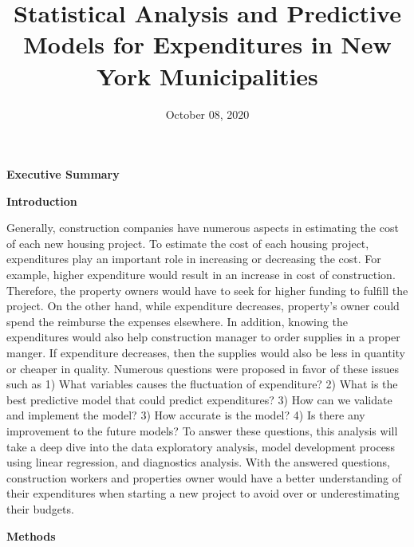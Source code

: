 \documentclass[11pt]{article}\usepackage[]{graphicx}\usepackage[]{color}
\title{Statistical Analysis and Predictive Models for Expenditures in New York Municipalities\vspace{-5ex}}
\date{October 08, 2020\vspace{-5ex}}
\begin{document}
 
\maketitle








\noindent\textbf{Executive Summary} 
\hfill \break

\noindent\textbf{Introduction} 

\noindent Generally, construction companies have numerous aspects in estimating the cost of each new housing project. To estimate the cost of each housing project, expenditures play an important role in increasing or decreasing the cost. For example, higher expenditure would result in an increase in cost of construction. Therefore, the property owners would have to seek for higher funding to fulfill the project. On the other hand, while expenditure decreases, property’s owner could spend the reimburse the expenses elsewhere. In addition, knowing the expenditures would also help construction manager to order supplies in a proper manger. If expenditure decreases, then the supplies would also be less in quantity or cheaper in quality. Numerous questions were proposed in favor of these issues such as 1) What variables causes the fluctuation of expenditure? 2) What is the best predictive model that could predict expenditures? 3) How can we validate and implement the model? 3) How accurate is the model? 4) Is there any improvement to the future models? To answer these questions, this analysis will take a deep dive into the data exploratory analysis, model development process using linear regression, and diagnostics analysis. With the answered questions, construction workers and properties owner would have a better understanding of their expenditures when starting a new project to avoid over or underestimating their budgets.
\hfill \break

\noindent\textbf{Methods} 
\end{document}
